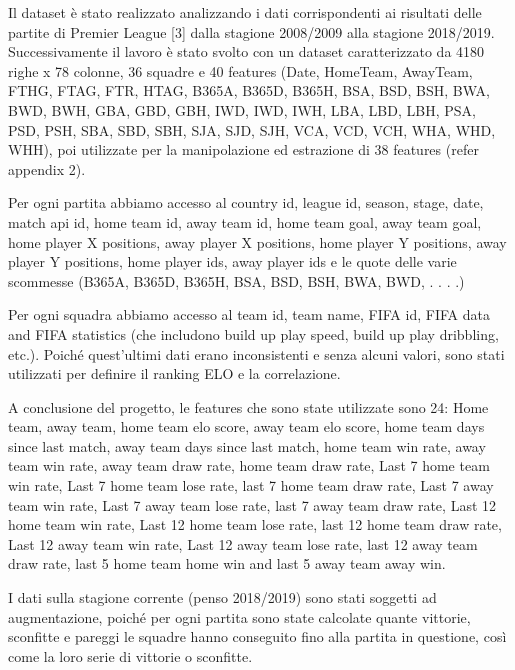 Il dataset è stato realizzato analizzando i dati corrispondenti ai risultati delle partite di Premier League [3]
dalla stagione 2008/2009 alla stagione 2018/2019.
Successivamente il lavoro è stato svolto con un dataset caratterizzato da 4180 righe x 78 colonne, 
36 squadre e 40 features (Date, HomeTeam, AwayTeam, FTHG, FTAG, FTR, HTAG, 
B365A, B365D, B365H, BSA, BSD, BSH, BWA, BWD, BWH, GBA, GBD, GBH, IWD, IWD, IWH, LBA, LBD, LBH, PSA, PSD, PSH, SBA,
SBD, SBH, SJA, SJD, SJH, VCA, VCD, VCH, WHA, WHD, WHH), poi utilizzate per la manipolazione ed estrazione di 38 features (refer appendix 2).

Per ogni partita abbiamo accesso al country id, league id, season, stage, date, match api id,
home team id, away team id, home team goal, away team goal, home player X positions,
away player X positions, home player Y positions, away player Y positions, home player ids,
away player ids e le quote delle varie scommesse (B365A, B365D, B365H, BSA, BSD, BSH, BWA, BWD, . . . .)

Per ogni squadra abbiamo accesso al team id, team name, FIFA id, FIFA data 
and FIFA statistics (che includono build up play speed, build up play dribbling, etc.).
Poiché quest'ultimi dati erano inconsistenti e senza alcuni valori, 
sono stati utilizzati per definire il ranking ELO e la correlazione.

A conclusione del progetto, le features che sono state utilizzate sono 24: Home team, away team, 
home team elo score, away team elo score, home team days since last match, 
away team days since last match, home team win rate, away team win rate, 
away team draw rate, home team draw rate, Last 7 home team win rate, 
Last 7 home team lose rate, last 7 home team draw rate, Last 7 away team win rate, 
Last 7 away team lose rate, last 7 away team draw rate, Last 12 home team win rate, 
Last 12 home team lose rate, last 12 home team draw rate, Last 12 away team win rate, 
Last 12 away team lose rate, last 12 away team draw rate, last 5 home team home win 
and last 5 away team away win.

I dati sulla stagione corrente (penso 2018/2019) sono stati soggetti ad augmentazione,
poiché per ogni partita sono state calcolate quante vittorie, sconfitte e pareggi 
le squadre hanno conseguito fino alla partita in questione, così come la loro serie di vittorie o sconfitte.

